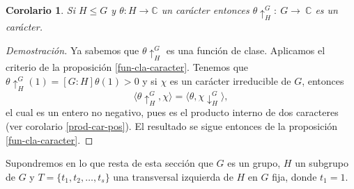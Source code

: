 \documentclass[12pt]{book}
\newtheorem{corollary}[theorem]{Corolario}
\theoremstyle{definition}
\newcounter{in}
\begin{document}
\begin{corollary}
  \label{car-inducido}
  Si $H\leq G$ y $\theta:H\rightarrow \mathbb{C}$ un carácter
  entonces $\theta\uparrow^{G}_{H}:~G\rightarrow~\mathbb{C}$ es un carácter.
\end{corollary}
\begin{proof}[Demostración]
  Ya sabemos que $\theta\uparrow^{G}_{H}$ es una función de
  clase. Aplicamos el criterio de la proposición
  \ref{fun-cla-caracter}. Tenemos que
  $\theta\uparrow^{G}_{H}(1)=[G:H]\theta(1)>0$ y si $\chi$ es un
  carácter irreducible de $G$, entonces
  \begin{equation*}
    \langle\theta\uparrow^{G}_{H},\chi\rangle=\langle\theta,\chi\downarrow^{G}_{H}\rangle,
  \end{equation*}
  el cual es un entero no negativo, pues es el producto interno de dos
  caracteres (ver corolario \ref{prod-car-pos}). El resultado se sigue entonces de la proposición
  \ref{fun-cla-caracter}.
\end{proof}
Supondremos en lo que resta de esta sección que $G$ es un grupo, $H$ un subgrupo de
$G$  y $T=\{t_{1},t_{2},\ldots,t_{s}\}$ una transversal izquierda de
$H$ en $G$ fija, donde $t_{1}=1$.
\end{document}
